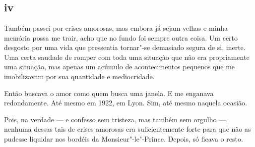 \chapter*{}
\section{iv}

\noindent{}Também passei por crises amorosas, mas embora já sejam velhas e minha
memória possa me trair, acho que no fundo foi sempre outra coisa. Um
certo desgosto por uma vida que pressentia tornar"-se demasiado segura
de si, inerte. Uma certa saudade de romper com toda uma
situação que não era propriamente uma situação, mas apenas um acúmulo
de acontecimentos pequenos que me imobilizavam por sua quantidade e
mediocridade.

Então buscava o amor como quem busca uma janela. E me enganava
redondamente. Até mesmo em 1922, em Lyon. Sim, até mesmo naquela
ocasião.

Pois, na verdade --- e confesso sem tristeza, mas também sem orgulho ---,
nenhuma dessas tais de crises amorosas era suficientemente forte
para que não as pudesse liquidar nos bordéis da Monsieur"-le"-Prince.
Depois, só ficava o resto.

\pagebreak
\thispagestyle{empty}
\movetoevenpage
\thispagestyle{empty}

